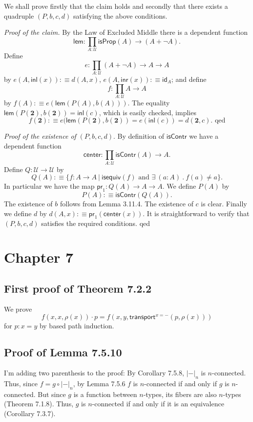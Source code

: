 \documentclass[12pt]{article}
\newcommand{\mbf}{\mathbf}
\newcommand{\msf}{\mathsf}
\newcommand{\de}{:\equiv}
\newcommand{\id}{\mathsf{id}}
\newcommand{\nn}{\noindent}
\newcommand{\U}{\mathcal U}
\begin{document}
We shall prove firstly that the claim holds and secondly that there exists a quadruple $(P,b,c,d)$ satisfying the above conditions.

\nn\emph{Proof of the claim.} By the Law of Excluded Middle there is a dependent function 
$$
\msf{lem}:\prod_{A:\U}\msf{isProp}(A)\to(A+\neg A).
$$ 
Define 
$$
e:\prod_{A:\U}(A+\neg A)\to A\to A
$$ 
by $e(A,\msf{inl}(x))\de d(A,x)$, $e(A,\msf{inr}(x))\de\id_A$; and define 
$$
f:\prod_{A:\U}A\to A
$$ 
by $f(A)\de e(\msf{lem}(P(A),b(A)))$. The equality $\msf{lem}(P(\mbf2),b(\mbf2))=\msf{inl}(c)$, which is easily checked, implies  
$$
f(\mbf2)\de e(\msf{lem}(P(\mbf2),b(\mbf2))=e(\msf{inl}(c))=d(\mbf2,c).\text{ qed} 
$$ 

\nn\emph{Proof of the existence of} $(P,b,c,d)$. By definition of $\msf{isContr}$ we have a dependent function 
$$
\msf{center}:\prod_{A:\U}\msf{isContr}(A)\to A.
$$ 
Define $Q:\U\to\U$ by 
$$
Q(A)\de\{f:A\to A\ |\ \msf{isequiv}(f)\text{ and }\exists\ (a:A)\ .\ f(a)\neq a\}.
$$ 
In particular we have the map 
$
\msf{pr}_1:Q(A)\to A\to A.
$ 
We define $P(A)$ by 
$$
P(A)\de\msf{isContr}(Q(A)).
$$ 
The existence of $b$ follows from Lemma 3.11.4. The existence of $c$ is clear. Finally we define $d$ by $d(A,x)\de\msf{pr}_1(\msf{center}(x))$. It is straightforward to verify that $(P,b,c,d)$ satisfies the required conditions. qed


\section{Chapter 7}


\subsection{First proof of Theorem 7.2.2}

We prove 
$$
f(x,x,\rho(x))\cdot p=f(x,y,\msf{transport}^{x=-}(p,\rho(x)))
$$ 
for $p:x=y$ by based path induction.


\subsection{Proof of Lemma 7.5.10}

I'm adding two parenthesis to the proof: By Corollary 7.5.8, $|-|_n$ is $n$-connected. Thus, since $f=g\circ |-|_n$, by Lemma 7.5.6 $f$ is $n$-connected if and only if $g$ is $n$-connected. But since $g$ is a function between $n$-types, its fibers are also $n$-types (Theorem 7.1.8). Thus, $g$ is $n$-connected if and only if it is an equivalence (Corollary 7.3.7).
\end{document}
